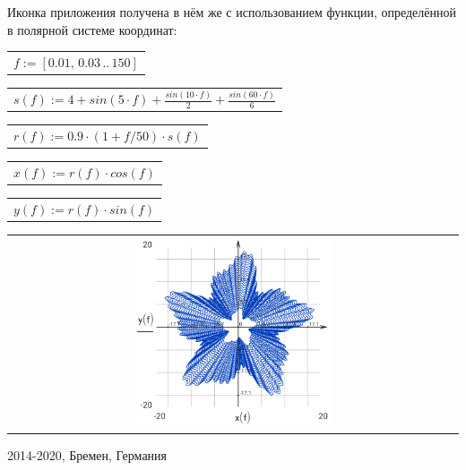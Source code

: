 \documentclass[DIV=calc, paper=a4, fontsize=11pt, twocolumn]{scrartcl}
\begin{document}
Иконка приложения получена в нём же
с использованием функции,
определённой в полярной системе
координат:
\begin{center}\begin{tabular}{c}
  $f := \left[ 0.01,\, 0.03 \,..\, 150 \right]$
\end{tabular}\end{center}
\begin{center}\begin{tabular}{c}
  $s(f) := 4 + sin \left( 5 \cdot f\right)  + \frac{sin \left( 10 \cdot f\right) }{2} + \frac{sin \left( 60 \cdot f\right) }{6}$
\end{tabular}\end{center}
\begin{center}\begin{tabular}{c}
  $r(f) := 0.9 \cdot \left( 1 + f / 50 \right) \cdot s \left( f\right) $
\end{tabular}\end{center}
\begin{center}\begin{tabular}{c}
  $x(f) := r \left( f\right)  \cdot cos \left( f\right) $
\end{tabular}\end{center}
\begin{center}\begin{tabular}{c}
  $y(f) := r \left( f\right)  \cdot sin \left( f\right) $
\end{tabular}\end{center}
\begin{center}\begin{tabular}{c} \includegraphics[width=0.45\textwidth]{graphics/about_micromath_fig1.png} \end{tabular}\end{center}

2014-2020, Бремен, Германия
\end{document}
